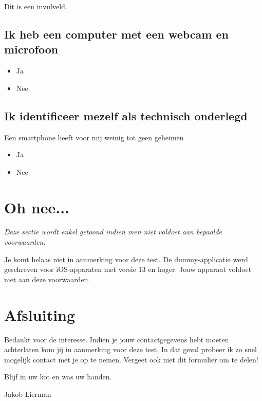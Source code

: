 Dit is een invulveld.

\subsection*{Ik heb een computer met een webcam en microfoon}

\begin{itemize}
    \item Ja
    \item Nee
\end{itemize}

\subsection*{Ik identificeer mezelf als technisch onderlegd}

Een smartphone heeft voor mij weinig tot geen geheimen

\begin{itemize}
    \item Ja
    \item Nee
\end{itemize}

\section{Oh nee...}
\label{sec:voldoet-niet}

\textit{Deze sectie wordt enkel getoond indien men niet voldoet aan bepaalde voorwaarden.}

Je komt helaas niet in aanmerking voor deze test. De dummy-applicatie werd geschreven voor iOS-apparaten met versie 13 en hoger. Jouw apparaat voldoet niet aan deze voorwaarden.

\section{Afsluiting}

Bedankt voor de interesse. Indien je jouw contactgegevens hebt moeten achterlaten kom jij in aanmerking voor deze test. In dat geval probeer ik zo snel mogelijk contact met je op te nemen. Vergeet ook niet dit formulier om te delen!

Blijf in uw kot en was uw handen. 

Jakob Lierman
